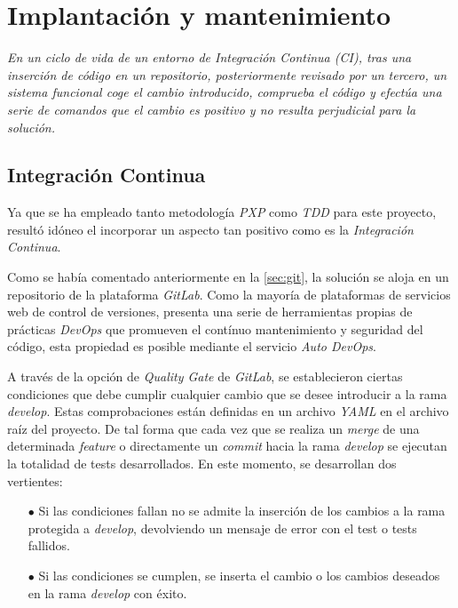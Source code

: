 \chapter{Implantación y mantenimiento}
\textit{En un ciclo de vida de un entorno de Integración Continua (CI),
tras una inserción de código en un repositorio, posteriormente revisado por
un tercero, un sistema funcional coge el cambio introducido, comprueba
el código y efectúa una serie de comandos que el cambio es positivo
y no resulta perjudicial para la solución.~\cite{6802994}}

\section{Integración Continua}
Ya que se ha empleado tanto metodología \textit{PXP} como \textit{TDD} para este proyecto,
resultó idóneo el incorporar un aspecto tan positivo como es
la \textit{Integración Continua}.

Como se había comentado anteriormente en la \autoref{sec:git},
la solución se aloja en un repositorio de la plataforma \textit{GitLab}.
Como la mayoría de plataformas de servicios web de control de versiones,
presenta una serie de herramientas propias de prácticas \textit{DevOps} que promueven
el contínuo mantenimiento y seguridad del código, esta propiedad es
posible mediante el servicio \textit{Auto DevOps}.

A través de la opción de \textit{Quality Gate} de \textit{GitLab},
se establecieron ciertas condiciones que debe cumplir cualquier
cambio que se desee introducir a la rama \textit{develop}. Estas comprobaciones
están definidas en un archivo \textit{YAML} en el archivo raíz del
proyecto. De tal forma que cada vez que se realiza un \textit{merge} de una
determinada \textit{feature} o directamente un \textit{commit} hacia la rama
\textit{develop} se ejecutan la totalidad de tests desarrollados. En este
momento, se desarrollan dos vertientes:

\begin{itemize}
    \item[$\bullet$] Si las condiciones fallan no se admite la inserción de los
    cambios a la rama protegida a \textit{develop}, devolviendo un mensaje de error con el test o tests
    fallidos.
    \item[$\bullet$] Si las condiciones se cumplen, se inserta el cambio o los cambios deseados en la rama \textit{develop} con éxito.
\end{itemize}

